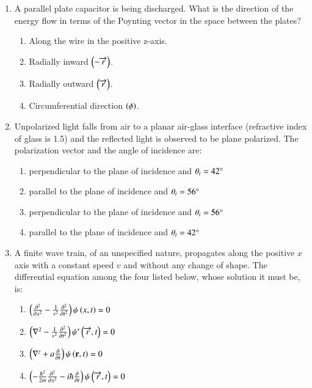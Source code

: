 \documentclass[journal,9pt,onecolumn]{IEEEtran}
\begin{document}
\begin{enumerate}
\item A parallel plate capacitor is being discharged. What is the direction of the energy flow in terms of the Poynting vector in the space between the plates?
\begin{center}
    
\end{center}
\begin{multicols}{2}
\begin{enumerate}
    \item Along the wire in the positive z-axis.
    \item Radially inward $\left(-\overrightarrow{r}\right)$.
    \item Radially outward $\left(\overrightarrow{r}\right)$.
    \item Circumferential direction $\left(\phi\right)$.
\end{enumerate}
\end{multicols}



\item Unpolarized light falls from air to a planar air-glass interface (refractive index of glass is 1.5) and the reflected light is observed to be plane polarized. The polarization vector and the angle of incidence are:

\begin{enumerate}
        \item perpendicular to the plane of incidence and $\theta_{i}=42\degree$
        \item parallel to the plane of incidence and $\theta_{i}=56\degree$
        \item perpendicular to the plane of incidence and $\theta_{i}=56\degree$
        \item parallel to the plane of incidence and $\theta_{i}=42\degree$
\end{enumerate}


\item A finite wave train, of an unspecified nature, propagates along the positive $x$ axis with a constant speed $v$ and without any change of shape. The differential equation among the four listed below, whose solution it must be, is: 
   
\begin{multicols}{2}
\begin{enumerate}
       \item $\left(\frac{\partial^2}{\partial x^2} - \frac{1}{v^2} \frac{\partial^2}{\partial t^2}\right) \psi\left(x,t\right) = 0$
        \item $\left( \nabla^2 - \frac{1}{v^2} \frac{\partial^2}{\partial t^2} \right) \psi'\left(\overrightarrow{r},t\right) = 0$
        \item $\left(\nabla^z + a \frac{\partial}{\partial t}\right) \psi\left(\mathbf{r},t\right) = 0$
        \item $\left(-\frac{\hbar^2}{2m} \frac{\partial^2}{\partial x^2} - i \hbar \frac{\partial}{\partial t}\right) \psi\left(\overrightarrow{r},t\right) = 0$


\end{enumerate}
\end{multicols}
\end{enumerate}
\end{document}
